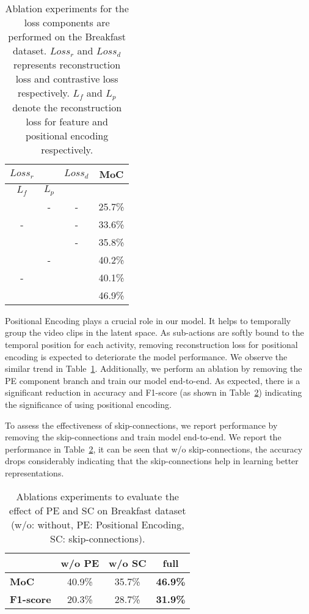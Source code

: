 \documentclass[final]{cvpr}
\newcommand{\cmark}{\ding{51}}
\begin{document}
\begin{table}
  \caption{{\small Ablation experiments for the loss components are performed on the Breakfast dataset. $Loss_{r}$ and $Loss_{d}$ represents reconstruction loss and contrastive loss respectively. $L_{f}$ and $L_{p}$ denote the reconstruction loss for feature and positional encoding  respectively.}}
  \label{tab:ablation_loss}
  \centering
  \small
  \begin{tabular}{cc|c|c}
    \toprule
     $Loss_{r}$ & & $Loss_{d}$ & \textbf{MoC} \\
     \midrule
     $L_{f}$ & $L_{p}$ & & \\
     \midrule
     \cmark & - & - &25.7\%\\
     - & \cmark & - & 33.6\%\\
     \cmark & \cmark & - & 35.8\%\\ 
     \midrule
     \cmark & - & \cmark &  40.2\%\\
     - & \cmark & \cmark & 40.1\%\\
     \cmark & \cmark & \cmark & 46.9\%\\
    \bottomrule
    \end{tabular}
\end{table}

 Positional Encoding plays a crucial role in our model. It helps to temporally group the video clips in the latent space. As sub-actions are softly bound to the temporal position for each activity, removing reconstruction loss for positional encoding is expected to deteriorate the model performance. We observe the similar trend in Table~\ref{tab:ablation_loss}. Additionally, we perform an ablation by removing the PE component branch and train our model end-to-end. As expected, there is a significant reduction in accuracy and F1-score (as shown in Table~\ref{tab:ablation}) indicating the significance of using positional encoding.

 To assess the effectiveness of skip-connections, we report performance by removing the skip-connections and train model end-to-end. We report the performance in Table~\ref{tab:ablation}, it can be seen that w/o skip-connections, the accuracy drops considerably indicating that the skip-connections help in learning better representations.


\begin{table}[h]
 \caption{{\small Ablations experiments to evaluate the effect of PE and SC on Breakfast dataset (w/o: without, PE: Positional Encoding, SC: skip-connections).} 
 }
    \label{tab:ablation}
    \centering
    \begin{tabular}{l|cc|c}
    \toprule
     & \textbf{w/o PE} & \textbf{w/o SC} & \textbf{full} \\
     \midrule
     \textbf{MoC} & 40.9\% & 35.7\% & \textbf{46.9\%} \\
     \textbf{F1-score} & 20.3\% & 28.7\%  & \textbf{31.9\%} \\
    \bottomrule
    \end{tabular}
\end{table}
\end{document}
